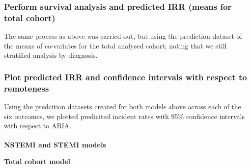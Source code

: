 \documentclass[11pt]{article}
\begin{document}
\subsubsection{Perform survival analysis and predicted IRR (means for total cohort)}
The same process as above was carried out, but using the prediction dataset of the means of co-variates for the total analysed cohort; noting that we still stratified analysis by diagnosis.
\color{violet}
\begin{stlog}\end{stlog}
\color{black}
\subsubsection{Plot predicted IRR and confidence intervals with respect to remoteness}
Using the predcition datasets created for both models above across each of the six outcomes, we plotted predicited incident rates with 95\% confidence intervals with respect to ARIA. \\~\\
\textbf{NSTEMI and STEMI models}
\color{violet}
\begin{stlog}\end{stlog}
\color{black}
\textbf{Total cohort model}
\color{violet}
\begin{stlog}\end{stlog}
\clearpage
\color{black}

\end{document}
